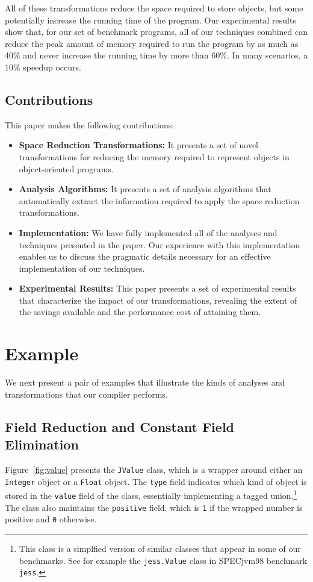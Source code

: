 \documentclass{acmconf}
\begin{document}
All of these transformations reduce the space required to store
objects, but some potentially increase the running time of the program.
Our experimental results show that, for our set of benchmark
programs, all of our techniques combined can reduce the peak amount of memory
required to run the program by as much as 40\% and never increase the
running time by more than 60\%.  In many scenarios, a 10\% speedup occurs.

\subsection{Contributions}

This paper makes the following contributions:
\begin{itemize}
\item {\bf Space Reduction Transformations:} It presents a set
of novel transformations for reducing the memory required to 
represent objects in object-oriented programs.

\item {\bf Analysis Algorithms:} It presents a set of 
analysis algorithms that automatically extract the 
information required to apply the space reduction 
transformations.

\item {\bf Implementation:} We have fully 
implemented all of the analyses and techniques 
presented in the paper. Our experience with this
implementation enables us to discuss the pragmatic
details necessary for an effective implementation 
of our techniques. 

\item {\bf Experimental Results:} This paper presents a set
of experimental results that characterize the impact
of our transformations, revealing the extent of the
savings available and the performance cost of attaining them.
\end{itemize}
%
\section{Example}
%
We next present a pair of examples that illustrate the kinds of 
analyses and transformations that our compiler performs.
%
\subsection{Field Reduction and Constant Field Elimination}
%
Figure~\ref{fig:value} presents the {\tt JValue} class, which is 
a wrapper around either an {\tt Integer} object or a {\tt Float}
object. The {\tt type} field indicates which kind of object
is stored in the {\tt value} field of the class, 
essentially implementing a tagged 
union.\footnote{This class is a simplfied version of similar
classes that appear in some of our benchmarks.
See for example the {\tt jess.Value} class in SPECjvm98 benchmark
{\tt jess}.} 
The class also maintains the {\tt positive} field, which is
{\tt 1} if the wrapped number is positive and {\tt 0} otherwise. 
\end{document}
